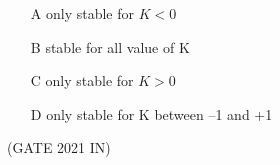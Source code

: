 \begin{enumerate}[label=\thechapter.\arabic*,ref=\thechapter.\theenumi]
\begin{center}
\end{center}
\begin{enumerate}
\item[A]only stable for $K < 0$
\item[B]stable for all value of K
\item[C]only stable for $K > 0$
\item[D]only stable for K between –1 and +1
\end{enumerate}
\hfill(GATE 2021 IN)\\
\solution

\pagebreak
\end{enumerate}
